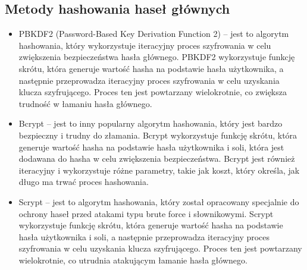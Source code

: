 \subsection{Metody hashowania haseł głównych}

\begin{itemize}
    \item PBKDF2 (Password-Based Key Derivation Function 2) – jest to algorytm hashowania, który wykorzystuje iteracyjny proces szyfrowania w celu zwiększenia bezpieczeństwa hasła głównego. PBKDF2 wykorzystuje funkcję skrótu, która generuje wartość hasha na podstawie hasła użytkownika, a następnie przeprowadza iteracyjny proces szyfrowania w celu uzyskania klucza szyfrującego. Proces ten jest powtarzany wielokrotnie, co zwiększa trudność w łamaniu hasła głównego.
    \item Bcrypt – jest to inny popularny algorytm hashowania, który jest bardzo bezpieczny i trudny do złamania. Bcrypt wykorzystuje funkcję skrótu, która generuje wartość hasha na podstawie hasła użytkownika i soli, która jest dodawana do hasha w celu zwiększenia bezpieczeństwa. Bcrypt jest również iteracyjny i wykorzystuje różne parametry, takie jak koszt, który określa, jak długo ma trwać proces hashowania.
    \item Scrypt – jest to algorytm hashowania, który został opracowany specjalnie do ochrony haseł przed atakami typu brute force i słownikowymi. Scrypt wykorzystuje funkcję skrótu, która generuje wartość hasha na podstawie hasła użytkownika i soli, a następnie przeprowadza iteracyjny proces szyfrowania w celu uzyskania klucza szyfrującego. Proces ten jest powtarzany wielokrotnie, co utrudnia atakującym łamanie hasła głównego.
\end{itemize}
